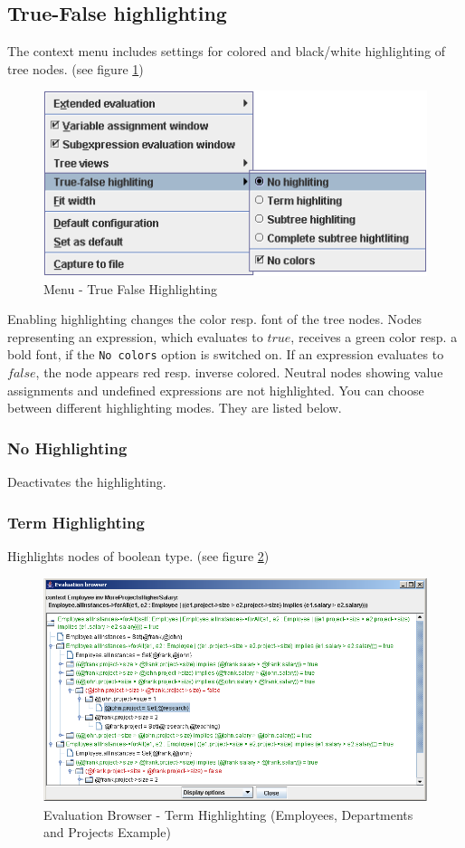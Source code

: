 \documentclass[a4paper,titlepage,oneside,final]{scrreprt} %
\begin{document}
\subsection{True-False highlighting}
The context menu includes settings for colored and black/white highlighting of tree nodes.
(see figure \ref{fig:EvaluationBrowserMenuTrueFalse})
\begin{figure}[ht]
\centering
\includegraphics[scale=0.7]{Screenshots/GUI/EvaluationBrowserMenuTrueFalse.png}
\caption{Menu - True False Highlighting}
\label{fig:EvaluationBrowserMenuTrueFalse}
\end{figure}
Enabling highlighting changes the color resp. font of the tree nodes.
Nodes representing an expression, which evaluates to $\mathit{true}$, receives a green
color resp. a bold font, if the \verb+No colors+ option is switched on.
If an expression evaluates to $\mathit{false}$, the node
appears red resp. inverse colored.
Neutral nodes showing value assignments and undefined expressions are not highlighted.
You can choose between different highlighting modes. They are listed below.
\subsubsection{No Highlighting}
Deactivates the highlighting.
\subsubsection{Term Highlighting}
Highlights nodes of boolean type. (see figure \ref{fig:EvaluationBrowserTermHighlighting})
\begin{figure}[ht]
\centering
\includegraphics[scale=0.5]{Screenshots/GUI/EvaluationBrowserTermHighlighting.png}
\caption{Evaluation Browser - Term Highlighting (Employees, Departments and Projects Example)}
\label{fig:EvaluationBrowserTermHighlighting}
\end{figure}
\end{document}
